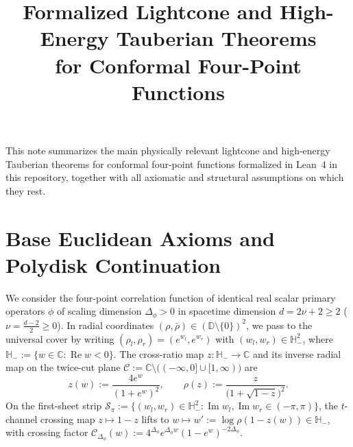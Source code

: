 \documentclass[10pt,a4paper]{article}
\title{\vspace{-1.6cm}\textbf{\large Formalized Lightcone and High-Energy Tauberian Theorems\\for Conformal Four-Point Functions}\vspace{-0.7cm}}
\author{}
\date{}
\theoremstyle{definition}
\begin{document}
\maketitle
\vspace{-1.3cm}

This note summarizes the main physically relevant lightcone and high-energy Tauberian theorems for conformal four-point functions formalized in Lean~4 in this repository, together with all axiomatic and structural assumptions on which they rest.

\section{Base Euclidean Axioms and Polydisk Continuation}

We consider the four-point correlation function of identical real scalar primary operators $\phi$ of scaling dimension $\Delta_\phi > 0$ in spacetime dimension $d = 2\nu + 2 \ge 2$ ($\nu = \frac{d-2}{2} \ge 0$). In radial coordinates $(\rho, \bar{\rho}) \in (\mathbb{D} \setminus \{0\})^2$, we pass to the universal cover by writing $(\rho_l, \rho_r) = (e^{w_l}, e^{w_r})$ with $(w_l, w_r) \in \mathbb{H}_-^2$, where $\mathbb{H}_- := \{w \in \mathbb{C} : \operatorname{Re} w < 0\}$. The cross-ratio map $z : \mathbb{H}_- \to \mathbb{C}$ and its inverse radial map on the twice-cut plane $\mathcal{C} := \mathbb{C} \setminus \bigl((-\infty, 0] \cup [1, \infty)\bigr)$ are
\begin{equation}
  z(w) := \frac{4 e^w}{(1 + e^w)^2}, \qquad
  \rho(z) := \frac{z}{\bigl(1 + \sqrt{1 - z}\bigr)^2}.
\end{equation}
On the first-sheet strip $\mathcal{S}_\pi := \{(w_l, w_r) \in \mathbb{H}_-^2 : \operatorname{Im} w_l, \operatorname{Im} w_r \in (-\pi, \pi)\}$, the $t$-channel crossing map $z \mapsto 1 - z$ lifts to $w \mapsto w' := \log \rho(1 - z(w)) \in \mathbb{H}_-$, with crossing factor $\mathcal{C}_{\Delta_\phi}(w) := 4^{\Delta_\phi} e^{\Delta_\phi w} (1 - e^w)^{-2\Delta_\phi}$.
\end{document}
